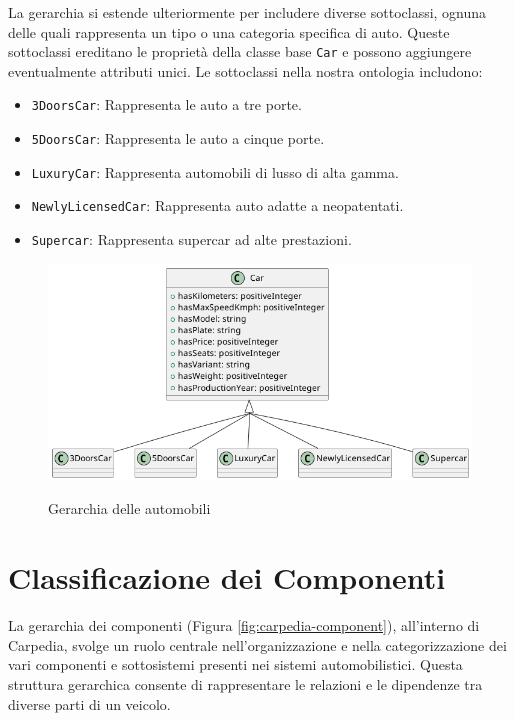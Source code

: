 La gerarchia si estende ulteriormente per includere diverse sottoclassi, ognuna delle quali rappresenta un tipo o una categoria specifica di auto. Queste sottoclassi ereditano le proprietà della classe base \texttt{Car} e possono aggiungere eventualmente attributi unici. Le sottoclassi nella nostra ontologia includono:

\begin{itemize}
    \item \texttt{3DoorsCar}: Rappresenta le auto a tre porte.
    \item \texttt{5DoorsCar}: Rappresenta le auto a cinque porte.
    \item \texttt{LuxuryCar}: Rappresenta automobili di lusso di alta gamma.
    \item \texttt{NewlyLicensedCar}: Rappresenta auto adatte a neopatentati.
    \item \texttt{Supercar}: Rappresenta supercar ad alte prestazioni.
\end{itemize}

\begin{figure}
    \caption{Gerarchia delle automobili}
    \includegraphics[width=\textwidth]{figures/carpedia-car.png}
    \label{fig:carpedia-car}
\end{figure}

\section{Classificazione dei Componenti}

La gerarchia dei componenti (Figura \ref{fig:carpedia-component}), all'interno di Carpedia, svolge un ruolo centrale nell'organizzazione e nella categorizzazione dei vari componenti e sottosistemi presenti nei sistemi automobilistici. Questa struttura gerarchica consente di rappresentare le relazioni e le dipendenze tra diverse parti di un veicolo.

